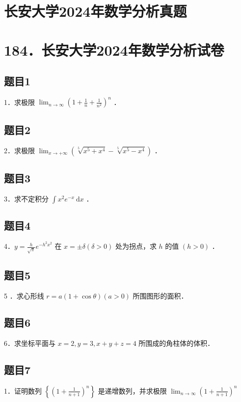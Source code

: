 \documentclass{article}
\begin{document}
\section*{长安大学2024年数学分析真题}
\section*{184．长安大学2024年数学分析试卷}

\subsection{题目1}
1．求极限 \(\lim _{n \rightarrow \infty}\left(1+\frac{1}{n}+\frac{1}{n^{2}}\right)^{n}\) ．

\subsection{题目2}
2．求极限 \(\lim _{x \rightarrow+\infty}\left(\sqrt[5]{x^{5}+x^{4}}-\sqrt[5]{x^{5}-x^{4}}\right)\) ．

\subsection{题目3}
3．求不定积分 \(\int x^{2} e^{-x} \mathrm{~d} x\) ．

\subsection{题目4}
4．\(y=\frac{h}{\sqrt{\pi}} e^{-h^{2} x^{2}}\) 在 \(x= \pm \delta(\delta>0)\) 处为拐点，求 \(h\) 的值 \((h>0)\) ．

\subsection{题目5}
5 ．求心形线 \(r=a(1+\cos \theta)(a>0)\) 所围图形的面积．

\subsection{题目6}
6．求坐标平面与 \(x=2, y=3, x+y+z=4\) 所围成的角柱体的体积．

\subsection{题目7}
1．证明数列 \(\left\{\left(1+\frac{1}{n+1}\right)^{n}\right\}\) 是递增数列，并求极限 \(\lim _{n \rightarrow \infty}\left(1+\frac{1}{n+1}\right)^{n}\)
\end{document}

